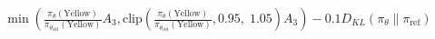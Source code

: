 \documentclass[preview]{standalone}
\begin{document}
\begin{align*}
\min \left(\frac{\pi_\theta(\text{Yellow})}{\pi_{\theta_{\text{old}}}(\text{Yellow})} A_3, \text{clip} \left( \frac{\pi_\theta(\text{Yellow})}{\pi_{\theta_{\text{old}}}(\text{Yellow})}, 0.95,\; 1.05 \right) A_3 \right) - 0.1 D_{KL}(\pi_\theta \parallel \pi_{\text{ref}})
\end{align*}
\end{document}
